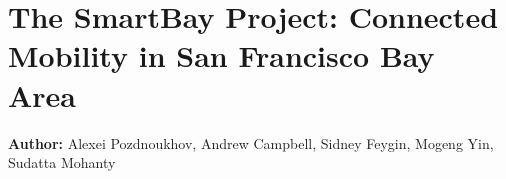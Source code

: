 \chapter{The SmartBay Project: Connected Mobility in San Francisco Bay Area}
\label{ch:sanfrancisco}
\hfill \textbf{Author:} Alexei Pozdnoukhov, Andrew Campbell, Sidney Feygin, Mogeng Yin, Sudatta Mohanty

